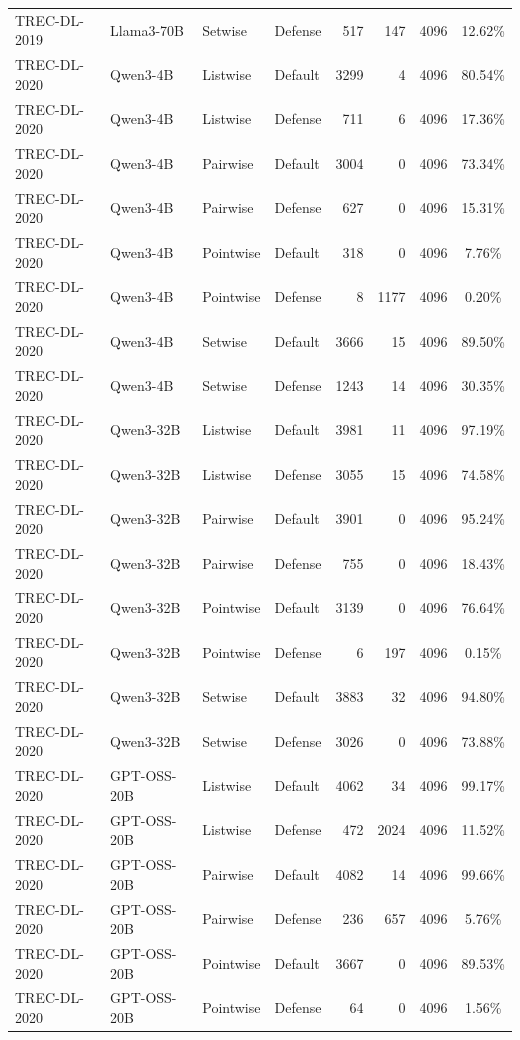 \begin{table}[t]
\begin{tabular}{ll l l r r r c}
TREC-DL-2019 & Llama3-70B & Setwise & Defense & 517 & 147 & 4096 & 12.62\% \\
TREC-DL-2020 & Qwen3-4B & Listwise & Default & 3299 & 4 & 4096 & 80.54\% \\
TREC-DL-2020 & Qwen3-4B & Listwise & Defense & 711 & 6 & 4096 & 17.36\% \\
TREC-DL-2020 & Qwen3-4B & Pairwise & Default & 3004 & 0 & 4096 & 73.34\% \\
TREC-DL-2020 & Qwen3-4B & Pairwise & Defense & 627 & 0 & 4096 & 15.31\% \\
TREC-DL-2020 & Qwen3-4B & Pointwise & Default & 318 & 0 & 4096 & 7.76\% \\
TREC-DL-2020 & Qwen3-4B & Pointwise & Defense & 8 & 1177 & 4096 & 0.20\% \\
TREC-DL-2020 & Qwen3-4B & Setwise & Default & 3666 & 15 & 4096 & 89.50\% \\
TREC-DL-2020 & Qwen3-4B & Setwise & Defense & 1243 & 14 & 4096 & 30.35\% \\
TREC-DL-2020 & Qwen3-32B & Listwise & Default & 3981 & 11 & 4096 & 97.19\% \\
TREC-DL-2020 & Qwen3-32B & Listwise & Defense & 3055 & 15 & 4096 & 74.58\% \\
TREC-DL-2020 & Qwen3-32B & Pairwise & Default & 3901 & 0 & 4096 & 95.24\% \\
TREC-DL-2020 & Qwen3-32B & Pairwise & Defense & 755 & 0 & 4096 & 18.43\% \\
TREC-DL-2020 & Qwen3-32B & Pointwise & Default & 3139 & 0 & 4096 & 76.64\% \\
TREC-DL-2020 & Qwen3-32B & Pointwise & Defense & 6 & 197 & 4096 & 0.15\% \\
TREC-DL-2020 & Qwen3-32B & Setwise & Default & 3883 & 32 & 4096 & 94.80\% \\
TREC-DL-2020 & Qwen3-32B & Setwise & Defense & 3026 & 0 & 4096 & 73.88\% \\
TREC-DL-2020 & GPT-OSS-20B & Listwise & Default & 4062 & 34 & 4096 & 99.17\% \\
TREC-DL-2020 & GPT-OSS-20B & Listwise & Defense & 472 & 2024 & 4096 & 11.52\% \\
TREC-DL-2020 & GPT-OSS-20B & Pairwise & Default & 4082 & 14 & 4096 & 99.66\% \\
TREC-DL-2020 & GPT-OSS-20B & Pairwise & Defense & 236 & 657 & 4096 & 5.76\% \\
TREC-DL-2020 & GPT-OSS-20B & Pointwise & Default & 3667 & 0 & 4096 & 89.53\% \\
TREC-DL-2020 & GPT-OSS-20B & Pointwise & Defense & 64 & 0 & 4096 & 1.56\% \\

\end{tabular}
\end{table}
